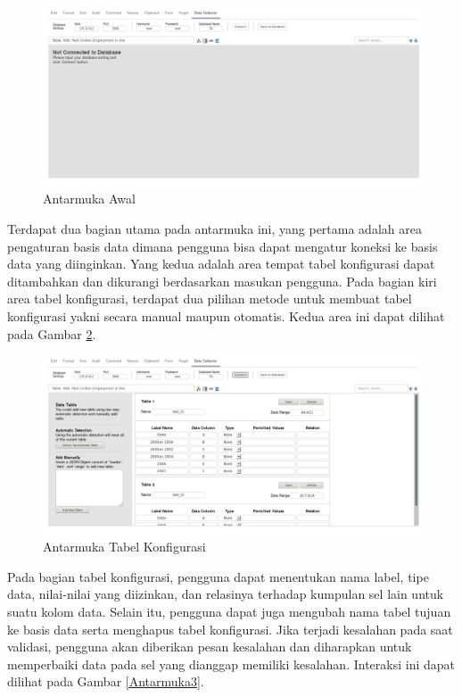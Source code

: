 	\begin{figure}[htb]
	    \centering
	    \includegraphics[width=1.0\textwidth]{resources/chapter-4-interface-1.png}
	    \caption{Antarmuka Awal}
		\label{Antarmuka1}
	\end{figure}

	Terdapat dua bagian utama pada antarmuka ini, yang pertama adalah area pengaturan basis data dimana pengguna bisa dapat mengatur koneksi ke basis data yang diinginkan. Yang kedua adalah area tempat tabel konfigurasi dapat ditambahkan dan dikurangi berdasarkan masukan pengguna. Pada bagian kiri area tabel konfigurasi, terdapat dua pilihan metode untuk membuat tabel konfigurasi yakni secara manual maupun otomatis. Kedua area ini dapat dilihat pada Gambar \ref{Antarmuka2}.

	\begin{figure}[htbp]
	    \centering
	    \includegraphics[width=1.0\textwidth]{resources/chapter-4-interface-2.png}
	    \caption{Antarmuka Tabel Konfigurasi}
		\label{Antarmuka2}
	\end{figure}

	Pada bagian tabel konfigurasi, pengguna dapat menentukan nama label, tipe data, nilai-nilai yang diizinkan, dan relasinya terhadap kumpulan sel lain untuk suatu kolom data. Selain itu, pengguna dapat juga mengubah nama tabel tujuan ke basis data serta menghapus tabel konfigurasi. Jika terjadi kesalahan pada saat validasi, pengguna akan diberikan pesan kesalahan dan diharapkan untuk memperbaiki data pada sel yang dianggap memiliki kesalahan. Interaksi ini dapat dilihat pada Gambar \ref{Antarmuka3}.

